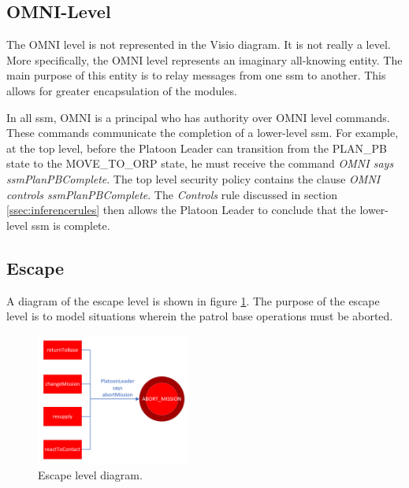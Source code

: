 \documentclass[../../main/main.tex]{subfiles}
\begin{document}
\subsection{OMNI-Level}\label{ssec:omnilevel}
The OMNI level is not represented in the Visio diagram.  It is not really a level.  More specifically, the OMNI level represents an imaginary all-knowing entity.  The main purpose of this entity is to relay messages from one \gls{ssm} to another.  This allows for greater encapsulation of the modules. 

In all \gls{ssm}, OMNI is a principal who has authority over OMNI level commands.  These commands communicate the completion of a lower-level \gls{ssm}.  For example, at the top level, before the Platoon Leader can transition from the PLAN_PB state to the MOVE_TO_ORP state, he must receive the command \textit{OMNI says ssmPlanPBComplete}.  The top level security policy contains the clause \textit{OMNI controls ssmPlanPBComplete}.  The \textit{Controls} rule discussed in section \ref{ssec:inferencerules} then allows the Platoon Leader to conclude that the lower-level \gls{ssm} is complete.  
\clearpage





\subsection{Escape}\label{ssec:escape}
A diagram of the escape level is shown in figure \ref{escapeDiagram}.  The purpose of the escape level is to model situations wherein the patrol base operations must be aborted.  

\begin{figure}[h!]
\centering
\includegraphics[width=0.45\textwidth]{../figures/escapeDiagram}
\caption{\label{escapeDiagram} Escape level diagram.}
\end{figure}
\end{document}
